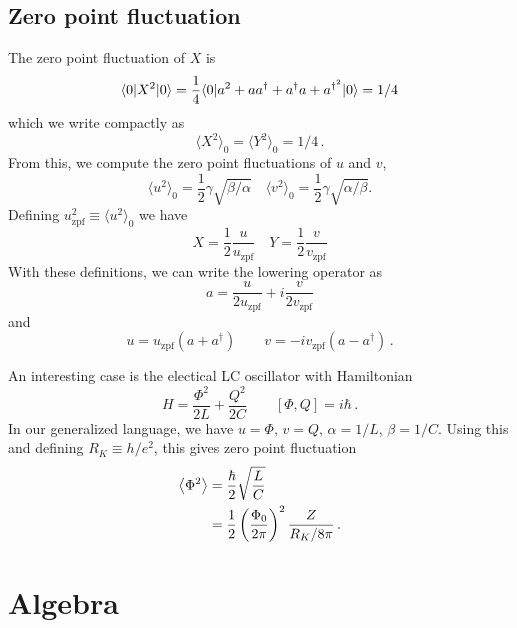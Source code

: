 \subsection{Zero point fluctuation}

The zero point fluctuation of $X$ is
\begin{equation}
\langle 0 | X^2 | 0 \rangle = \frac{1}{4}\langle 0 | a^2 + aa^{\dagger} + a^{\dagger}a + a^{\dagger^2} | 0 \rangle = 1/4
\end{equation}
which we write compactly as
\begin{equation}
\langle X^2 \rangle_0 = \langle Y^2 \rangle_0 = 1/4 \, .
\end{equation}
From this, we compute the zero point fluctuations of $u$ and $v$, \begin{equation}
\langle u^2 \rangle_0 = \frac{1}{2}\gamma \sqrt{\beta / \alpha} \quad \langle v^2 \rangle_0 = \frac{1}{2}\gamma \sqrt{\alpha / \beta} . \end{equation}
Defining $u_{\textrm{zpf}}^2 \equiv \langle u^2 \rangle_0 $ we have \begin{equation}
X = \frac{1}{2}\frac{u}{u_{\textrm{zpf}}} \quad Y = \frac{1}{2}\frac{v}{v_{\textrm{zpf}}} \end{equation}
With these definitions, we can write the lowering operator as
\begin{equation}
a = \frac{u}{2 u_\text{zpf}} + i \frac{v}{2 v_\text{zpf}}
\end{equation}
and
\begin{equation}
  u = u_\text{zpf}(a + a^\dagger) \qquad v = -i v_\text{zpf} (a - a^\dagger) \, .
\end{equation}

An interesting case is the electical LC oscillator with Hamiltonian
\begin{equation*}
  H = \frac{\Phi^2}{2L} + \frac{Q^2}{2C} \qquad [\Phi, Q] = i \hbar \, .
\end{equation*}
In our generalized language, we have $u = \Phi$, $v=Q$, $\alpha=1/L$, $\beta = 1/C$.
Using this and defining $R_K \equiv h/e^2$, this gives zero point fluctuation
\begin{align*}
  \left \langle \Phi^2 \right \rangle
  &= \frac{\hbar}{2} \sqrt{\frac{L}{C}} \\
  &= \frac{1}{2} \left( \frac{\Phi_0}{2\pi} \right)^2 \frac{Z}{R_K/8\pi} \, .
\end{align*}

\section{Algebra}

